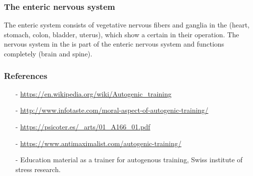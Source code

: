 \begin{frame}
\frametitle{The enteric nervous system}


The enteric system consists of vegetative nervous fibers and ganglia in the  (heart, stomach, colon, bladder, uterus), which show a certain  in their operation. The nervous system in the  is part of the enteric nervous system and functions completely  (brain and spine).

\end{frame}


\begin{frame}
\frametitle{References}
\begin{itemize}
\item[-] \url{https://en.wikipedia.org/wiki/Autogenic_training}
\item[-] \url{http://www.infotaste.com/moral-aspect-of-autogenic-training/}
\item[-] \url{https://psicoter.es/_arts/01_A166_01.pdf}
\item[-] \url{https://www.antimaximalist.com/autogenic-training/}
\item[-] Education material as a trainer for autogenous training, Swiss institute of stress research.
\end{itemize}
\end{frame}
